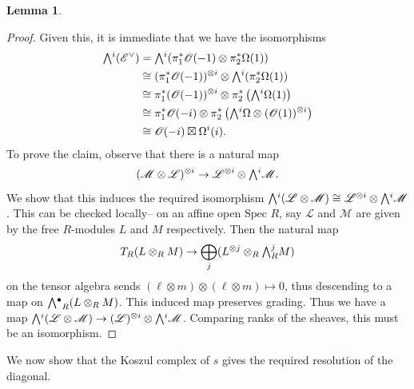 \documentclass[a4paper]{article}
\theoremstyle{definition}
\newtheorem{lemma}[defn]{Lemma}
\theoremstyle{remark}
\newcommand{\Exter}{\mathchoice{{\textstyle\bigwedge}}%
    {{\bigwedge}}%
    {{\textstyle\wedge}}%
    {{\scriptstyle\wedge}}}
\DeclareMathOperator{\exterior}{\Exter^\bullet}
\begin{document}
\begin{lemma}
\begin{proof}
        Given this, it is immediate that we have the isomorphisms
        \begin{align*}
            \Exter^i(\mathscr{E}^\vee) 
            &= \Exter^i(\pi_1^\ast \mathscr{O}(-1)\otimes \pi_2^\ast \Omega(1)) \\ 
            &\cong (\pi_1^\ast \mathscr{O}(-1))^{\otimes i} \otimes
            \Exter^i(\pi_2^\ast \Omega(1)) \\
            &\cong \pi_1^\ast (\mathscr{O}(-1))^{\otimes i} \otimes
             \pi_2^\ast \left(\Exter^i\Omega (1)\right) \\
            &\cong \pi_1^\ast\mathscr{O}(-i) \otimes \pi_2^\ast
            \left(\Exter^i\Omega \otimes (\mathscr{O}(1))^{\otimes i}\right) \\
            &\cong \mathscr{O}(-i)\boxtimes \Omega^i(i).
        \end{align*}
        To prove the claim, observe that there is a natural map 
        \[(\mathscr{M}\otimes \mathscr{L})^{\otimes i}\rightarrow
        \mathscr{L}^{\otimes i} \otimes \Exter^i \mathscr{M}.\]
        We show that this induces the required isomorphism
        \(\Exter^i(\mathscr{L}\otimes
        \mathscr{M}) \cong \mathscr{L}^{\otimes i}\otimes \Exter^i\mathscr{M}\).
        This can be checked locally-- on an affine open \(\text{Spec }R\), say
        \(\mathscr{L}\) and \(\mathscr{M}\) are given by the free \(R\)-modules
        \(L\) and \(M\) respectively. Then the natural map \[T_R(L\otimes_R
        M) \rightarrow \bigoplus_j (L^{\otimes j}\otimes_R \Exter_R^j M)\] 
        on the tensor algebra sends \((\ell\otimes m) \otimes (\ell \otimes
        m)\mapsto 0\), thus descending to a map on \(\exterior_R(L\otimes_R
        M)\). This induced map preserves grading. Thus we have a map
        \(\Exter^i(\mathscr{L}\otimes \mathscr{M}) \rightarrow
        (\mathscr{L})^{\otimes i} \otimes \Exter^i \mathscr{M}\). Comparing
        ranks of the sheaves, this must be an isomorphism.
    \end{proof}
\end{lemma}

We now show that the Koszul complex of \(s\) gives the required resolution of
the diagonal.
\end{document}
